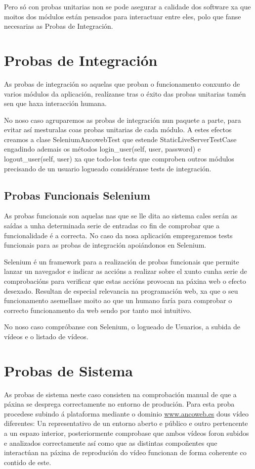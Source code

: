         Pero só con probas unitarias non se pode asegurar a calidade dos software xa que moitos dos
        módulos están pensados para interactuar entre eles, polo que fanse necesarias as Probas de
        Integración.

\section{Probas de Integración}

    As probas de integración so aquelas que proban o funcionamento conxunto de varios módulos da 
    aplicación, realízanse tras o éxito das probas unitarias tamén sen que haxa interacción humana.
    
    No noso caso agruparemos as probas de integración nun paquete a parte, para evitar así 
    mesturalas coas probas unitarias de cada módulo. A estes efectos creamos a clase SeleniumAncowebTest
    que estende StaticLiveServerTestCase engadindo ademais os métodos login\_user(self, user, 
    password) e logout\_user(self, user) xa que todo-los tests que comproben outros módulos precisando
    de un usuario logueado considéranse tests de integración.

    \subsection{Probas Funcionais Selenium}

        As probas funcionais son aquelas nas que se lle dita ao sistema cales serán as saídas a unha 
        determinada serie de entradas co fin de comprobar que a funcionalidade é a correcta. No caso da
        nosa aplicación empregaremos tests funcionais para as probas de integración apoiándonos en Selenium.
        
        Selenium é un framework para a realización de probas funcionais que permite lanzar un navegador
        e indicar as accións a realizar sobre el xunto cunha serie de comprobacións para verificar que
        estas accións provocan na páxina web o efecto desexado. Resultan de especial relevancia na 
        programación web, xa que o seu funcionamento asemellase moito ao que un humano faría para 
        comprobar o correcto funcionamento da web sendo por tanto moi intuitivo.
        
        No noso caso compróbanse con Selenium, o logueado de Usuarios, a subida de vídeos e o listado de
        vídeos.
    
\section{Probas de Sistema}
    As probas de sistema neste caso consisten na comprobación manual de que a páxina se desprega 
    correctamente no entorno de produción. Para esta proba procedese subindo á plataforma mediante 
    o dominio \url{www.ancoweb.es} dous vídeo diferentes: Un representativo de un entorno aberto e público
    e outro pertencente a un espazo interior, posteriormente comprobase que ambos vídeos foron
    subidos e analizados correctamente así como que as distintas compoñentes que interactúan na 
    páxina de reprodución do vídeo funcionan de forma coherente co contido de este. 

